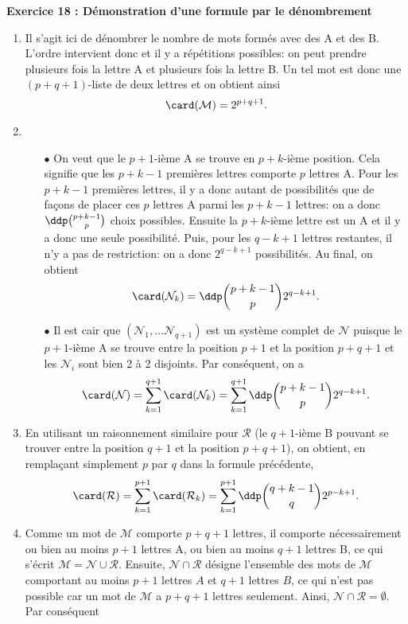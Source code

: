 \documentclass[a4paper, 11pt,reqno]{article}
\begin{document}
\begin{correction}  \; \textbf{Exercice 18 : D\'emonstration d'une formule par le d\'enombrement}
\begin{enumerate}
 \item Il s'agit ici de d\'enombrer le nombre de mots form\'es avec des A et des B. L'ordre intervient donc et il y a r\'ep\'etitions possibles: 
on peut prendre plusieurs fois la lettre A et plusieurs fois la lettre B. Un tel mot est donc une $(p+q+1)$-liste de deux lettres et on obtient ainsi
$$\card (\mathcal{M})=2^{p+q+1}.$$
\item 
\begin{itemize}
 \item[$\bullet$] On veut que le $p+1$-i\`eme A se trouve en $p+k$-i\`eme position. Cela signifie que les $p+k-1$ premi\`eres lettres comporte 
$p$ lettres A. Pour les $p+k-1$ premi\`eres lettres, il y a donc autant de possibilit\'es que de fa\c{c}ons de placer ces $p$ lettres A parmi les $p+k-1$ lettres: on a donc $\ddp \binom{p+k-1}{p}$ choix possibles. Ensuite la $p+k$-i\`eme lettre est un A et il y a donc une seule possibilit\'e. Puis, pour les $q-k+1$ lettres restantes, il n'y a pas de restriction: on a donc $2^{q-k+1}$ possibilit\'es. Au final, on obtient
$$\card (\mathcal{N}_k)= \ddp \binom{p+k-1}{p}2^{q-k+1}.$$ 
\item[$\bullet$]  Il est cair que $\left( \mathcal{N}_1,\dots \mathcal{N}_{q+1} \right)$ est un syst\`eme complet de $\mathcal{N}$ puisque le $p+1$-i\`eme A se trouve entre la position $p+1$ et la position $p+q+1$ et les $\mathcal{N}_i$ sont bien 2 \`a 2 disjoints. Par cons\'equent, on a 
$$\card (\mathcal{N})=\sum\limits_{k=1}^{q+1}\card(\mathcal{N}_k)=\sum\limits_{k=1}^{q+1} \ddp \binom{p+k-1}{p}2^{q-k+1}.$$
\end{itemize}
\item En utilisant un raisonnement similaire pour $\mathcal{R}$ (le $q+1$-i\`eme B pouvant se trouver entre la position $q+1$ et la position $p+q+1$), on obtient, en rempla\c{c}ant simplement $p$ par $q$ dans la formule pr\'ec\'edente,
$$\card (\mathcal{R})=\sum\limits_{k=1}^{p+1}\card(\mathcal{R}_k)=\sum\limits_{k=1}^{p+1} \ddp \binom{q+k-1}{q}2^{p-k+1}.$$
\item Comme un mot de $\mathcal{M}$ comporte $p+q+1$ lettres, il comporte n\'ecessairement ou bien au moins $p+1$ lettres A, ou bien au moins $q+1$ lettres B, ce qui s'\'ecrit $\mathcal{M}=\mathcal{N}\cup\mathcal{R}$. Ensuite, $\mathcal{N}\cap \mathcal{R}$ d\'esigne l'ensemble des mots de $\mathcal{M}$ comportant au moins $p+1$ lettres $A$ et $q+1$ lettres $B$, ce qui n'est pas possible car un mot de $\mathcal{M}$ a $p+q+1$ lettres seulement. Ainsi, $\mathcal{N}\cap\mathcal{R}=\emptyset$. Par cons\'equent

\end{enumerate}
\end{correction}
\end{document}

